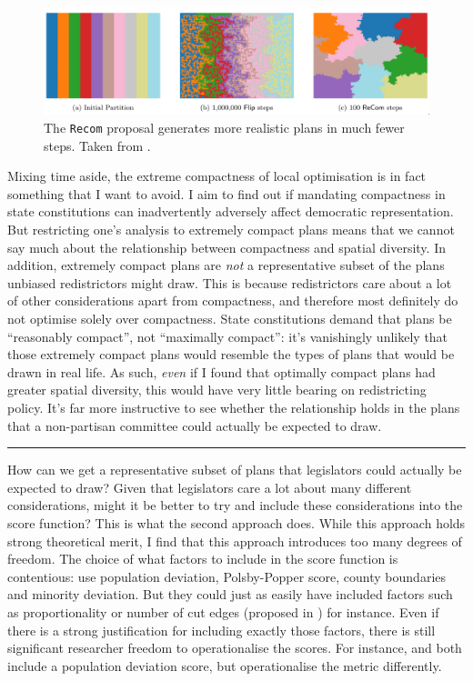 \documentclass[]{article}
\begin{document}
\begin{figure}
\centering
\includegraphics{img/recom_vs_flip.png}
\caption{\label{recom_vs_flip} The \texttt{Recom} proposal generates
more realistic plans in much fewer steps. Taken from
\cite{ddj2019recom}.}
\end{figure}

Mixing time aside, the extreme compactness of local optimisation is in
fact something that I want to avoid. I aim to find out if mandating
compactness in state constitutions can inadvertently adversely affect
democratic representation. But restricting one's analysis to extremely
compact plans means that we cannot say much about the relationship
between compactness and spatial diversity. In addition, extremely
compact plans are \emph{not} a representative subset of the plans
unbiased redistrictors might draw. This is because redistrictors care
about a lot of other considerations apart from compactness, and
therefore most definitely do not optimise solely over compactness. State
constitutions demand that plans be ``reasonably compact'', not
``maximally compact'': it's vanishingly unlikely that those extremely
compact plans would resemble the types of plans that would be drawn in
real life. As such, \emph{even} if I found that optimally compact plans
had greater spatial diversity, this would have very little bearing on
redistricting policy. It's far more instructive to see whether the
relationship holds in the plans that a non-partisan committee could
actually be expected to draw.

\begin{center}\rule{0.5\linewidth}{\linethickness}\end{center}

How can we get a representative subset of plans that legislators could
actually be expected to draw? Given that legislators care a lot about
many different considerations, might it be better to try and include
these considerations into the score function? This is what the second
approach does. While this approach holds strong theoretical merit, I
find that this approach introduces too many degrees of freedom. The
choice of what factors to include in the score function is contentious:
\citeauthor{h2018} use population deviation, Polsby-Popper score, county
boundaries and minority deviation. But they could just as easily have
included factors such as proportionality or number of cut edges
(proposed in \cite{dc2016}) for instance. Even if there is a strong
justification for including exactly those factors, there is still
significant researcher freedom to operationalise the scores. For
instance, \citeauthor{h2018} and \citeauthor{dd2019va} both include a
population deviation score, but operationalise the metric differently.
\end{document}
